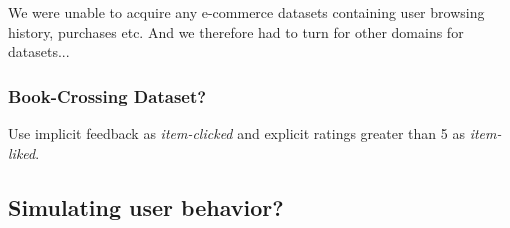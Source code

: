 We were unable to acquire any e-commerce datasets containing user browsing history, purchases etc.
And we therefore had to turn for other domains for datasets...


\subsubsection{Book-Crossing Dataset?}

Use implicit feedback as \emph{item-clicked} and explicit ratings greater than 5 as \emph{item-liked}.

\subsection{Simulating user behavior?}



